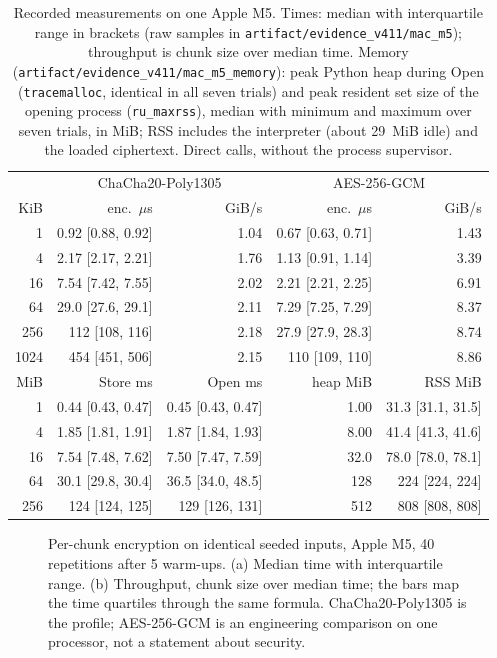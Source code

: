 \documentclass[pdflatex,sn-mathphys-num]{sn-jnl}
\newcommand{\code}[1]{\texttt{#1}}
\theoremstyle{plain}
\begin{document}
\begin{table}[htbp]
\caption{Recorded measurements on one Apple M5. Times: median with interquartile range in brackets (raw samples in \code{artifact/evidence\_v411/mac\_m5}); throughput is chunk size over median time. Memory (\code{artifact/evidence\_v411/mac\_m5\_memory}): peak Python heap during Open (\code{tracemalloc}, identical in all seven trials) and peak resident set size of the opening process (\code{ru\_maxrss}), median with minimum and maximum over seven trials, in MiB; RSS includes the interpreter (about 29~MiB idle) and the loaded ciphertext. Direct calls, without the process supervisor.}\label{tab:bench}
\centering\footnotesize
\begin{tabular}{@{}rrrrr@{}}\toprule
& \multicolumn{2}{c}{ChaCha20-Poly1305} & \multicolumn{2}{c}{AES-256-GCM}\\
KiB & enc.\ $\mu$s & GiB/s & enc.\ $\mu$s & GiB/s\\\midrule
1 & 0.92 [0.88, 0.92] & 1.04 & 0.67 [0.63, 0.71] & 1.43\\
4 & 2.17 [2.17, 2.21] & 1.76 & 1.13 [0.91, 1.14] & 3.39\\
16 & 7.54 [7.42, 7.55] & 2.02 & 2.21 [2.21, 2.25] & 6.91\\
64 & 29.0 [27.6, 29.1] & 2.11 & 7.29 [7.25, 7.29] & 8.37\\
256 & 112 [108, 116] & 2.18 & 27.9 [27.9, 28.3] & 8.74\\
1024 & 454 [451, 506] & 2.15 & 110 [109, 110] & 8.86\\\midrule
MiB & Store ms & Open ms & heap MiB & RSS MiB\\\midrule
1 & 0.44 [0.43, 0.47] & 0.45 [0.43, 0.47] & 1.00 & 31.3 [31.1, 31.5]\\
4 & 1.85 [1.81, 1.91] & 1.87 [1.84, 1.93] & 8.00 & 41.4 [41.3, 41.6]\\
16 & 7.54 [7.48, 7.62] & 7.50 [7.47, 7.59] & 32.0 & 78.0 [78.0, 78.1]\\
64 & 30.1 [29.8, 30.4] & 36.5 [34.0, 48.5] & 128 & 224 [224, 224]\\
256 & 124 [124, 125] & 129 [126, 131] & 512 & 808 [808, 808]\\\bottomrule
\end{tabular}
\end{table}

\begin{figure}[htbp]
\centering
\figbox{}
\caption{Per-chunk encryption on identical seeded inputs, Apple M5, 40 repetitions after 5 warm-ups. (a) Median time with interquartile range. (b) Throughput, chunk size over median time; the bars map the time quartiles through the same formula. ChaCha20-Poly1305 is the profile; AES-256-GCM is an engineering comparison on one processor, not a statement about security.}\label{fig:latency}
\end{figure}
\end{document}
